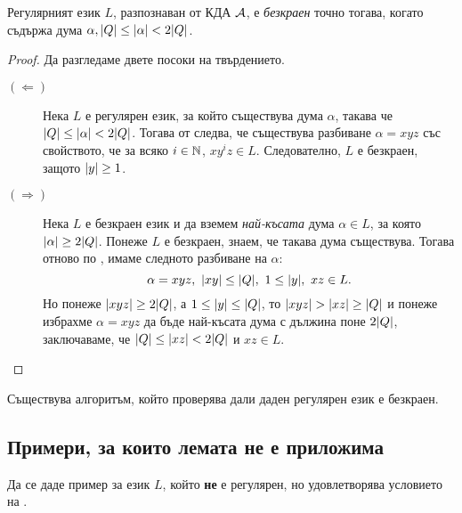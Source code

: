 \begin{prop}
  Регулярният език $L$, 
  разпознаван от КДА $\mathcal{A}$, е {\em безкраен} точно тогава, когато съдържа дума $\alpha, \lvert{Q}\rvert \leq \lvert{\alpha}\rvert < 2\lvert{Q}\rvert$.
\end{prop}
\begin{proof}
  Да разгледаме двете посоки на твърдението.
  \begin{description}
  \item[$(\Leftarrow)$]
    Нека $L$ е регулярен език, за който съществува дума $\alpha$, такава че $\lvert{Q}\rvert \leq \lvert{\alpha}\rvert < 2\lvert{Q}\rvert$.
    Тогава от  следва, че съществува разбиване $\alpha = xyz$ със свойството, че
    за всяко $i \in \mathbb{N}$, $xy^iz \in L$. Следователно, $L$ е безкраен, защото $\lvert{y}\rvert \geq 1$.
  \item[$(\Rightarrow)$]
    Нека $L$ е безкраен език и %
    да вземем {\em най-късата} дума $\alpha \in L$, за която $\lvert{\alpha}\rvert \geq 2\lvert{Q}\rvert$.
    Понеже $L$ е безкраен, знаем, че такава дума съществува.
    Тогава отново по , имаме следното разбиване на $\alpha$:
    \[\alpha = xyz,\ \abs{xy} \leq \abs{Q},\ 1\leq \abs{y},\ xz \in L.\]
    Но понеже $\lvert{xyz}\rvert \geq 2\lvert{Q}\rvert$, а $1 \leq \lvert{y}\rvert \leq \lvert{Q}\rvert$, то $\lvert{xyz}\rvert > \lvert{xz}\rvert \geq \lvert{Q}\rvert$ и понеже избрахме $\alpha = xyz$
    да бъде най-късата дума с дължина поне $2\lvert{Q}\rvert$, заключаваме, че $\lvert{Q}\rvert \leq \lvert{xz}\rvert < 2\lvert{Q}\rvert$ и $xz \in L$.
  \end{description}
\end{proof}

\begin{cor}
  Съществува алгоритъм, който проверява дали даден регулярен език е безкраен.
\end{cor}


\subsection*{Примери, за които лемата не е  приложима}

\begin{problem}
  Да се даде пример за език $L$, който {\bf не} е регулярен, но удовлетворява
  условието на .
\end{problem}

